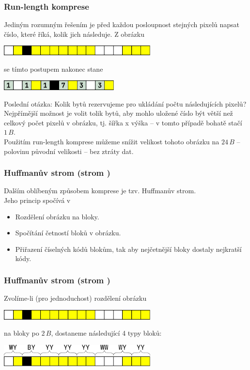 \documentclass[aspectratio=169,11pt,svgnames,handout]{beamer}
\begin{document}
\begin{frame}
 \frametitle{Run-length komprese}
 Jediným rozumným řešením je před každou posloupnost stejných pixelů napsat
 číslo, které říká, kolik jich následuje.
 \pause
 Z obrázku
 \begin{center}
  \includegraphics[width=8cm]{image-4.pdf}
  \vspace*{-.5em}
 \end{center}
 se tímto postupem nakonec stane
 \pause
 \begin{center}
  \includegraphics[width=6cm]{image-6.pdf}
  \vspace*{-.5em}
 \end{center}
 \pause
 Poslední otázka: Kolik bytů rezervujeme pro ukládání počtu následujících
 pixelů?\pause\\
 Nejpřímější možnost je volit tolik bytů, aby mohlo uložené číslo být větší než
 celkový počet pixelů v obrázku, tj. šířka x výška -- v tomto případě bohatě
 stačí $1\,B$.\pause\\
 Použitím \alert{run-length} komprese můžeme snížit velikost tohoto obrázku na
 $24\,B$ -- polovinu původní velikosti -- \alert{bez ztráty dat}.
\end{frame}

\begin{frame}
 \frametitle{Huffmanův strom (strom )}
 Dalším oblíbeným způsobem komprese je tzv. \alert{Huffmanův strom}.\pause\\
 Jeho princip spočívá v
 \begin{itemize}[label=\textbullet]
  \item Rozdělení obrázku na bloky.
  \pause
  \item Spočítání četností bloků v obrázku.
  \pause
  \item Přiřazení číselných kódů blokům, tak aby \alert{nejčetnější bloky
   dostaly nejkratší kódy}.
 \end{itemize}
\end{frame}

\begin{frame}
 \frametitle{Huffmanův strom (strom )}
 Zvolíme-li (pro jednoduchost) rozdělení obrázku
 \begin{center}
  \includegraphics[width=8cm]{image-4.pdf}
  \vspace*{-.5em}
 \end{center}
 na bloky po $2\,B$, dostaneme následující 4 typy bloků:
 \begin{center}
  \includegraphics[width=8cm]{image-7.pdf}
  \vspace*{-.5em}
 \end{center}
\end{frame}
\end{document}
